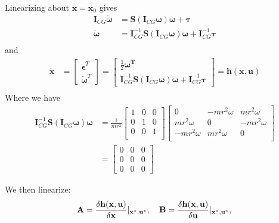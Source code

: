 Linearizing about $\boldsymbol{x} = \boldsymbol{x}_0$ gives
\begin{align}
    \boldsymbol{I}_{CG}\boldsymbol{\dot{\omega}} &= \boldsymbol{S}(\boldsymbol{I}_{CG}\boldsymbol{\omega})\boldsymbol{\omega} + \boldsymbol{\tau}  \\
    \boldsymbol{\dot{\omega}} &= \boldsymbol{I}^{-1}_{CG}\boldsymbol{S}(\boldsymbol{I}_{CG}\boldsymbol{\omega})\boldsymbol{\omega} + \boldsymbol{I}^{-1}_{CG}\boldsymbol{\tau} \\
\end{align}
and
\begin{align}
    \boldsymbol{\dot{x}} &= 
    \begin{bmatrix}
    \boldsymbol{\dot{\epsilon}}^T \\
    \boldsymbol{\dot{\omega}}^T
    \end{bmatrix}
    =
    \begin{bmatrix}
    \frac{1}{2}\boldsymbol{\omega^T} \\
    \boldsymbol{I}^{-1}_{CG}\boldsymbol{S}(\boldsymbol{I}_{CG}\boldsymbol{\omega})\boldsymbol{\omega} + \boldsymbol{I}^{-1}_{CG}\boldsymbol{\tau}
    \end{bmatrix}
    = \mathbf{h}(\mathbf{x},\mathbf{u}) \\
\end{align}
Where we have
\begin{align}
    \boldsymbol{I}^{-1}_{CG}\boldsymbol{S}(\boldsymbol{I}_{CG}\boldsymbol{\omega})\boldsymbol{\omega} &= 
    \frac{1}{mr^2} 
    \begin{bmatrix}
    1 & 0 & 0 \\
    0 & 1 & 0 \\
    0 & 0 & 1 \\
    \end{bmatrix}
    \begin{bmatrix}
     0 & -mr^2\omega & mr^2\omega \\
     mr^2\omega & 0 & -mr^2\omega \\
     -mr^2\omega & mr^2\omega & 0 \\
    \end{bmatrix} \\
    &= 
    \begin{bmatrix}
    0 & 0 & 0 \\
    0 & 0 & 0 \\
    0 & 0 & 0 
    \end{bmatrix}
\end{align}

We then linearize:
\begin{equation}
    \mathbf{A} = \frac{\delta \mathbf{h(x,u)}}{\delta \mathbf{x}} |_{\mathbf{x^*, u^*}}, 
    \quad \mathbf{B} = \frac{\delta \mathbf{h(x,u)}}{\delta \mathbf{u}} |_{\mathbf{x^*, u^*}}, \\
\end{equation}



